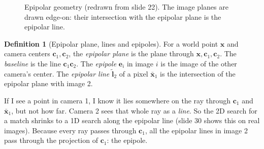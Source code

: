 \documentclass[11pt,a4paper]{article}
\newcommand{\xb}{\bar{\bm{x}}}
\theoremstyle{definition}
\newtheorem{definition}{Definition}[section]
\theoremstyle{plain}
\theoremstyle{remark}
\begin{document}
\begin{figure}[H]
\centering
{}
\caption{Epipolar geometry (redrawn from slide 22). The image planes are drawn edge-on: their intersection with the epipolar plane is the epipolar line.}
\label{fig:epi}
\end{figure}

\begin{definition}[Epipolar plane, lines and epipoles]\label{def:epidef}
For a world point $\bm x$ and camera centers $\bm c_1,\bm c_2$, the \emph{epipolar plane} is the plane through $\bm x,\bm c_1,\bm c_2$. The \emph{baseline} is the line
$\bm c_1\bm c_2$. The \emph{epipole} $\bm e_i$ in image $i$ is the image of the other camera's center. The \emph{epipolar line} $\tilde{\bm l}_2$ of a pixel
$\xb_1$ is the intersection of the epipolar plane with image 2.
\end{definition}

\begin{intuition}
If I see a point in camera 1, I know it lies somewhere on the ray through $\bm c_1$ and $\xb_1$, but not how far. Camera 2 sees that whole ray as a
\emph{line}. So the 2D search for a match shrinks to a 1D search along the epipolar line (slide 30 shows this on real images). Because every ray passes through $\bm c_1$, all
the epipolar lines in image 2 pass through the projection of $\bm c_1$: the epipole.
\end{intuition}
\end{document}

